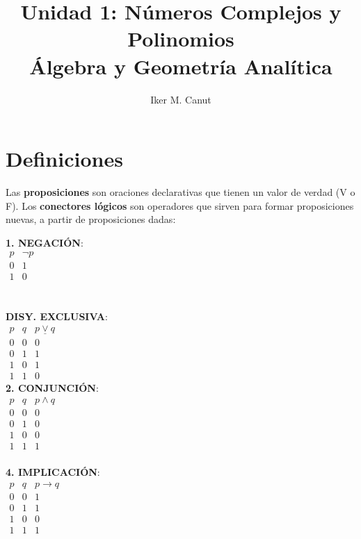 \documentclass[11pt,a4paper]{article}
\author{Iker M. Canut}
\title{Unidad 1: N\'umeros Complejos y Polinomios\\\'Algebra y Geometr\'ia Anal\'itica}
\begin{document}
\maketitle
\newpage

\section{Definiciones}
\noindent Las \textbf{proposiciones} son oraciones declarativas que tienen un valor de verdad (V o F). Los \textbf{conectores l\'ogicos} son operadores que sirven para formar proposiciones nuevas, a partir de proposiciones dadas:
\begin{multicols}{3}
\noindent \textbf{1. NEGACI\'ON}:\\

\indent $\begin{array}{|c|c|}
p & \lnot p\\
\hline
0 & 1 \\
1 & 0
\end{array}$\\ \\ \\

\noindent \textbf{DISY. EXCLUSIVA}: \\
\indent $\begin{array}{|cc|c|}
p & q & p \underline{\lor} q\\
\hline
0 & 0 & 0\\
0 & 1 & 1\\
1 & 0 & 1\\
1 & 1 & 0
\end{array}$\\

\noindent \textbf{2. CONJUNCI\'ON}:\\
\indent $\begin{array}{|cc|c|}
p & q & p \land q\\
\hline
0 & 0 & 0\\
0 & 1 & 0\\
1 & 0 & 0\\
1 & 1 & 1
\end{array}$\\ \\

\noindent \textbf{4. IMPLICACI\'ON}: \\
\indent $\begin{array}{|cc|c|}
p & q & p \rightarrow q\\
\hline
0 & 0 & 1\\
0 & 1 & 1\\
1 & 0 & 0\\
1 & 1 & 1
\end{array}$\\


\end{multicols}
\end{document}
